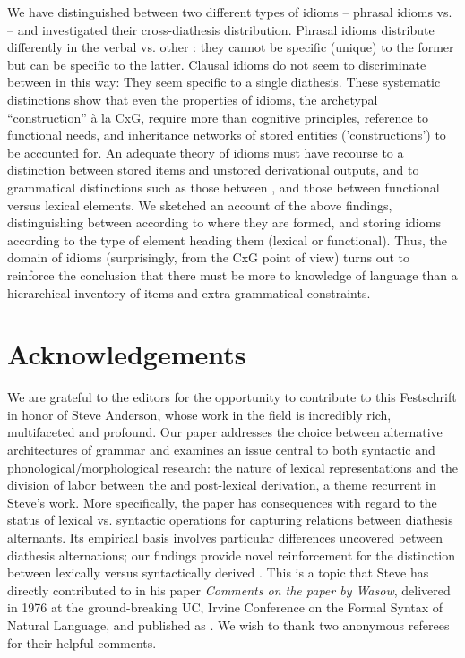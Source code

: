 \documentclass[output=paper,
modfonts
]{LSP/langsci}
\begin{document}
We have distinguished between two different types of idioms -- phrasal
idioms vs.  -- and investigated their cross-diathesis
distribution. Phrasal idioms distribute differently in the verbal
 vs. other : they cannot be specific (unique) to the
former but can be specific to the latter. Clausal idioms do not seem to
discriminate between  in this way: They seem specific to a
single diathesis. These systematic distinctions show that even the
properties of idioms, the archetypal ``construction'' à la CxG, require
more than cognitive principles, reference to functional needs, and inheritance
networks of stored entities ('constructions') to be accounted for. An
adequate theory of idioms must have recourse to a distinction between
stored items and unstored derivational outputs, and to grammatical
distinctions such as those between , and those between
functional versus lexical elements. We sketched an account of the above
findings, distinguishing between  according to where they are
formed, and storing idioms according to the type of element heading them
(lexical or functional). Thus, the domain of idioms (surprisingly, from
the CxG point of view) turns out to reinforce the conclusion that there
must be more to knowledge of language than a hierarchical inventory of
items and extra-grammatical constraints.

\section*{Acknowledgements}
We are grateful to the editors for the
  opportunity to contribute to this Festschrift in honor of Steve
  Anderson, whose work in the field is incredibly rich, multifaceted and
  profound. Our paper addresses the choice between alternative
  architectures of grammar and examines an issue central to both
  syntactic and phonological/morphological research: the nature of
  lexical representations and the division of labor between the 
  and post-lexical derivation, a theme recurrent in Steve's work. More
  specifically, the paper has consequences with regard to the status of
  lexical vs. syntactic operations for capturing relations between
  diathesis alternants. Its empirical basis involves particular
  differences uncovered between diathesis alternations; our findings
  provide novel reinforcement for the distinction between lexically
  versus syntactically derived . This is a topic that Steve has
  directly contributed to in his paper \emph{Comments on the paper by
  Wasow}, delivered in 1976 at the ground-breaking UC, Irvine Conference
  on the Formal Syntax of Natural Language, and published as \citet{anderson1977}. We wish to thank two anonymous referees for their helpful
  comments.
  
{\sloppy  
\printbibliography[heading=subbibliography,notkeyword=this]
}
\end{document}
